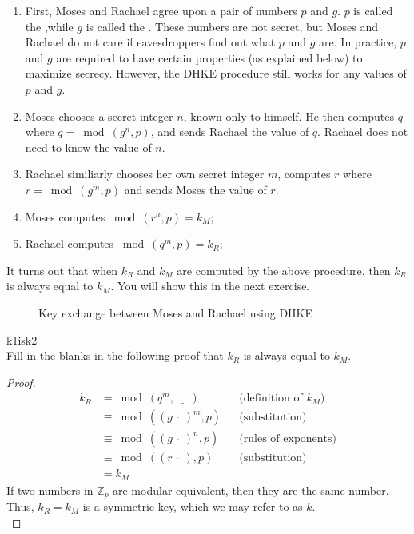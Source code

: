  \begin{enumerate}[Step 1.]
 \item First, Moses and Rachael agree upon a pair of numbers $p$ and $g$. $p$ is called the ,while $g$ is called the . These numbers are not secret, but Moses and Rachael do not care if eavesdroppers find out what $p$ and $g$ are. In practice, $p$ and $g$ are required to have certain properties (as explained below) to maximize secrecy.  However, the DHKE procedure still works for any values of $p$ and $g$.
\item Moses chooses a secret integer $n$, known only to himself.  He then computes $q$ where $q =\bmod(g^n,p)$, and sends Rachael the value of $q$. Rachael does not need to know the value of $n$.
\item Rachael similiarly chooses her own secret integer $m$, computes $r$ where $r =\bmod(g^m,p)$ and sends Moses the value of $r$.
\item Moses computes $ \bmod (r^n , p ) = k_M$;
\item Rachael computes $ \bmod (q^m , p ) = k_R$;
\end{enumerate} 
It turns out that when $k_R$ and $k_M$ are computed by the above procedure, then $k_R$ is always equal to $k_M$.  You will show this in the next exercise.  
\begin{figure}[htb]
	  \caption{\label{fig:DH:DHKE_1} Key exchange between Moses and Rachael using DHKE}
\end{figure}

\begin{exercise}{k1isk2}\\
Fill in the blanks in the following proof that  $k_R$ is always equal to  $k_M$.\\
  	\begin{proof} 
		\begin{align*} 
		k_R &=   \bmod (q^m , \underline{~~~~~~}) && \text{(definition of $k_M$)}
		\\&\equiv \bmod ((g^{\underline{~~~~~~}})^m , p) &&  \text{(substitution)}	
		\\&\equiv \bmod ((g^{\underline{~~~~~~}})^n , p) &&  \text{(rules of exponents)}
		\\&\equiv \bmod ((r^{\underline{~~~~~~}}) , p) &&  \text{(substitution)}		
		\\&= k_M
		\end{align*} 
   	If two numbers in $\mathbb{Z}_p$ are modular equivalent, then they are the same number. Thus, $k_R = k_M$ is a symmetric key, which we may refer to as $k$.\\

  	\end{proof}
\end{exercise}

